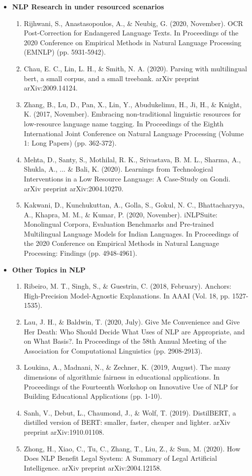 \documentclass[11pt,a4paper]{article}
\begin{document}
\begin{itemize}
\item \textbf{NLP Research in under resourced scenarios}
\begin{enumerate}
    \item Rijhwani, S., Anastasopoulos, A., \& Neubig, G. (2020, November). OCR Post-Correction for Endangered Language Texts. In Proceedings of the 2020 Conference on Empirical Methods in Natural Language Processing (EMNLP) (pp. 5931-5942).
    \item Chau, E. C., Lin, L. H., \& Smith, N. A. (2020). Parsing with multilingual bert, a small corpus, and a small treebank. arXiv preprint arXiv:2009.14124.
    \item Zhang, B., Lu, D., Pan, X., Lin, Y., Abudukelimu, H., Ji, H., \& Knight, K. (2017, November). Embracing non-traditional linguistic resources for low-resource language name tagging. In Proceedings of the Eighth International Joint Conference on Natural Language Processing (Volume 1: Long Papers) (pp. 362-372).
    \item Mehta, D., Santy, S., Mothilal, R. K., Srivastava, B. M. L., Sharma, A., Shukla, A., ... \& Bali, K. (2020). Learnings from Technological Interventions in a Low Resource Language: A Case-Study on Gondi. arXiv preprint arXiv:2004.10270.
    \item Kakwani, D., Kunchukuttan, A., Golla, S., Gokul, N. C., Bhattacharyya, A., Khapra, M. M., \& Kumar, P. (2020, November). iNLPSuite: Monolingual Corpora, Evaluation Benchmarks and Pre-trained Multilingual Language Models for Indian Languages. In Proceedings of the 2020 Conference on Empirical Methods in Natural Language Processing: Findings (pp. 4948-4961).
\end{enumerate}

\item \textbf{Other Topics in NLP}
\begin{enumerate}
\item Ribeiro, M. T., Singh, S., \& Guestrin, C. (2018, February). Anchors: High-Precision Model-Agnostic Explanations. In AAAI (Vol. 18, pp. 1527-1535).
\item Lau, J. H., \& Baldwin, T. (2020, July). Give Me Convenience and Give Her Death: Who Should Decide What Uses of NLP are Appropriate, and on What Basis?. In Proceedings of the 58th Annual Meeting of the Association for Computational Linguistics (pp. 2908-2913).
\item Loukina, A., Madnani, N., \& Zechner, K. (2019, August). The many dimensions of algorithmic fairness in educational applications. In Proceedings of the Fourteenth Workshop on Innovative Use of NLP for Building Educational Applications (pp. 1-10).
\item Sanh, V., Debut, L., Chaumond, J., \& Wolf, T. (2019). DistilBERT, a distilled version of BERT: smaller, faster, cheaper and lighter. arXiv preprint arXiv:1910.01108.
\item Zhong, H., Xiao, C., Tu, C., Zhang, T., Liu, Z., \& Sun, M. (2020). How Does NLP Benefit Legal System: A Summary of Legal Artificial Intelligence. arXiv preprint arXiv:2004.12158.
\end{enumerate}

\end{itemize}
\end{document}
